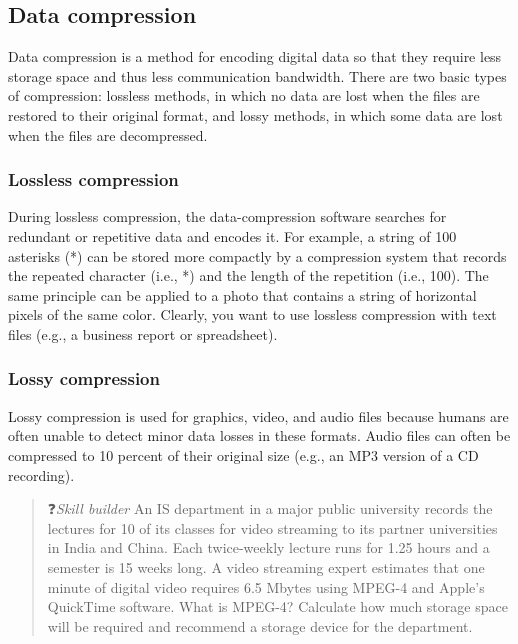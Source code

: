 \documentclass[
]{article}
\begin{document}
\hypertarget{data-compression}{%
\subsection*{Data compression}\label{data-compression}}

Data compression is a method for encoding digital data so that they
require less storage space and thus less communication bandwidth. There
are two basic types of compression: lossless methods, in which no data
are lost when the files are restored to their original format, and lossy
methods, in which some data are lost when the files are decompressed.

\hypertarget{lossless-compression}{%
\subsubsection*{Lossless compression}\label{lossless-compression}}

During lossless compression, the data-compression software searches for
redundant or repetitive data and encodes it. For example, a string of
100 asterisks (*) can be stored more compactly by a compression system
that records the repeated character (i.e., *) and the length of the
repetition (i.e., 100). The same principle can be applied to a photo
that contains a string of horizontal pixels of the same color. Clearly,
you want to use lossless compression with text files (e.g., a business
report or spreadsheet).

\hypertarget{lossy-compression}{%
\subsubsection*{Lossy compression}\label{lossy-compression}}

Lossy compression is used for graphics, video, and audio files because
humans are often unable to detect minor data losses in these formats.
Audio files can often be compressed to 10 percent of their original size
(e.g., an MP3 version of a CD recording).

\begin{quote}
❓\emph{Skill builder} An IS department in a major public university records
the lectures for 10 of its classes for video streaming to its partner
universities in India and China. Each twice-weekly lecture runs for
1.25 hours and a semester is 15 weeks long. A video streaming expert
estimates that one minute of digital video requires 6.5 Mbytes using
MPEG-4 and Apple's QuickTime software. What is MPEG-4? Calculate how
much storage space will be required and recommend a storage device for
the department.
\end{quote}
\end{document}
